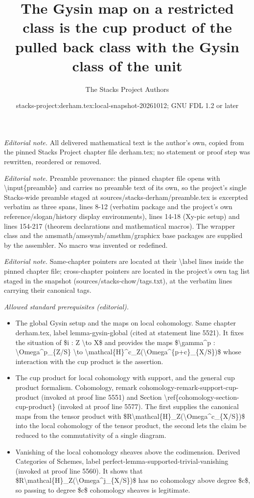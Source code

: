 \documentclass[10pt,a4paper]{amsart}
\title{The Gysin map on a restricted class is the cup product of the pulled back class with the Gysin class of the unit}
\author{The Stacks Project Authors}
\date{stacks-project:derham.tex:local-snapshot-20261012; GNU FDL 1.2 or later}
\theoremstyle{plain}
\theoremstyle{definition}
\theoremstyle{remark}
\numberwithin{equation}{subsection}
\begin{document}
\maketitle
\noindent\textit{Editorial note.} All delivered mathematical text is the author's own, copied from the pinned Stacks Project chapter file derham.tex; no statement or proof step was rewritten, reordered or removed.\par\medskip
\noindent\textit{Editorial note.} Preamble provenance: the pinned chapter file opens with \textbackslash{}input\{preamble\} and carries no preamble text of its own, so the project's single Stacks-wide preamble staged at sources/stacks-derham/preamble.tex is excerpted verbatim as three spans, lines 8-12 (verbatim package and the project's own reference/slogan/history display environments), lines 14-18 (Xy-pic setup) and lines 154-217 (theorem declarations and mathematical macros). The wrapper class and the amsmath/amssymb/amsthm/graphicx base packages are supplied by the assembler. No macro was invented or redefined.\par\medskip
\noindent\textit{Editorial note.} Same-chapter pointers are located at their \textbackslash{}label lines inside the pinned chapter file; cross-chapter pointers are located in the project's own tag list staged in the snapshot (sources/stacks-chow/tags.txt), at the verbatim lines carrying their canonical tags.\par\medskip
\noindent\textit{Allowed standard prerequisites (editorial).}\begin{itemize}
\item The global Gysin setup and the maps on local cohomology. Same chapter derham.tex, label lemma-gysin-global (cited at statement line 5521). It fixes the situation of \$i : Z \textbackslash{}to X\$ and provides the maps \$\textbackslash{}gamma\textasciicircum{}p : \textbackslash{}Omega\textasciicircum{}p\_\{Z/S\} \textbackslash{}to \textbackslash{}mathcal\{H\}\textasciicircum{}c\_Z(\textbackslash{}Omega\textasciicircum{}\{p+c\}\_\{X/S\})\$ whose interaction with the cup product is the assertion.
\item The cup product for local cohomology with support, and the general cup product formalism. Cohomology, remark cohomology-remark-support-cup-product (invoked at proof line 5551) and Section \textbackslash{}ref\{cohomology-section-cup-product\} (invoked at proof line 5577). The first supplies the canonical maps from the tensor product with \$R\textbackslash{}mathcal\{H\}\_Z(\textbackslash{}Omega\textasciicircum{}c\_\{X/S\})\$ into the local cohomology of the tensor product, the second lets the claim be reduced to the commutativity of a single diagram.
\item Vanishing of the local cohomology sheaves above the codimension. Derived Categories of Schemes, label perfect-lemma-supported-trivial-vanishing (invoked at proof line 5560). It shows that \$R\textbackslash{}mathcal\{H\}\_Z(\textbackslash{}Omega\textasciicircum{}j\_\{X/S\})\$ has no cohomology above degree \$c\$, so passing to degree \$c\$ cohomology sheaves is legitimate.
\end{itemize}\medskip
\end{document}
